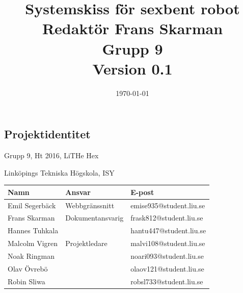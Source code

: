 \documentclass[a4paper,titlepage,12pt]{article}
\begin{document}
    \title{\LARGE
        \textbf{Systemskiss för sexbent robot} \\
        \vspace*{0.5\baselineskip}
        \large
        Redaktör Frans Skarman \\
        Grupp 9 \\
        \small
        \vspace*{0.5\baselineskip}
        Version 0.1}

    \date{\today}

	\maketitle
	
	\newpage
	
	\begin{center}


		\section*{Projektidentitet}
		Grupp 9, Ht 2016, LiTHe Hex

		Linköpings Tekniska Högskola, ISY

		\begin{table}[h]
			\begin{center}
				\begin{tabular}[pos]{ l l l }
					\textbf{Namn} & \textbf{Ansvar} & \textbf{E-post} \\ \midrule
					Emil Segerbäck & Webbgränssnitt & emise935@student.liu.se \\ \midrule
					Frans Skarman & Dokumentansvarig & frask812@student.liu.se \\ \midrule
					Hannes Tuhkala & & hantu447@student.liu.se \\ \midrule
					Malcolm Vigren & Projektledare & malvi108@student.liu.se \\ \midrule
					Noak Ringman &  &noari093@student.liu.se \\ \midrule
					Olav Övrebö &  & olaov121@student.liu.se \\ \midrule
					Robin Sliwa &  & robsl733@student.liu.se \\
				\end{tabular}
			\end{center}
		\end{table}


\end{center}
\end{document}
